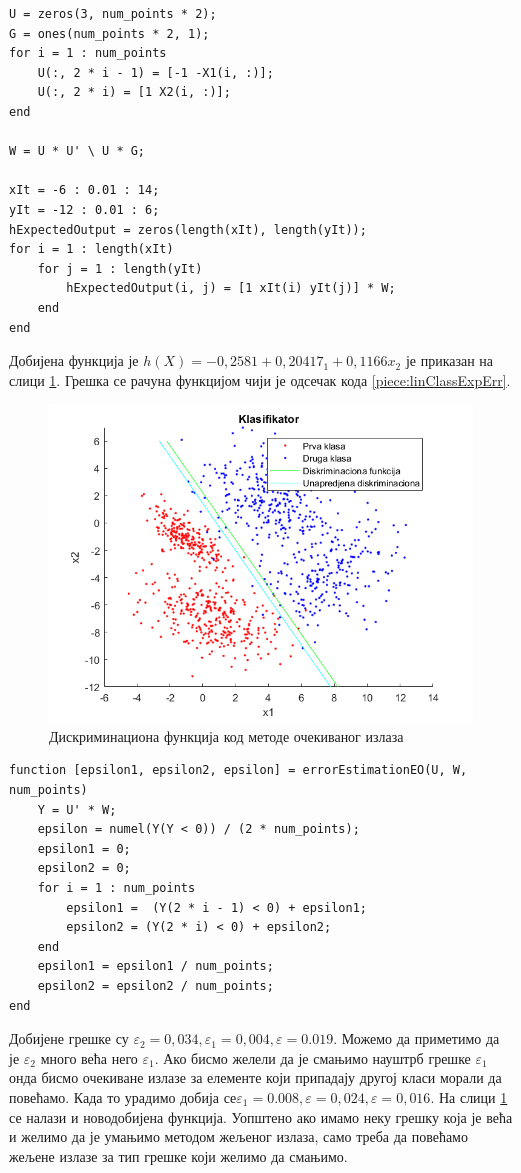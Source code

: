 \begin{lstlisting}[caption={Метода очекиваног излаза},label={piece:linClassExp}]
U = zeros(3, num_points * 2);
G = ones(num_points * 2, 1);
for i = 1 : num_points
    U(:, 2 * i - 1) = [-1 -X1(i, :)];
    U(:, 2 * i) = [1 X2(i, :)];
end

W = U * U' \ U * G;

xIt = -6 : 0.01 : 14;
yIt = -12 : 0.01 : 6;
hExpectedOutput = zeros(length(xIt), length(yIt));
for i = 1 : length(xIt)
    for j = 1 : length(yIt)
        hExpectedOutput(i, j) = [1 xIt(i) yIt(j)] * W;
    end
end
\end{lstlisting}

Добијена функција је $h(X) = -0,2581 + 0,20417_1 + 0,1166x_2$ је приказан на слици \ref{fig:expClassNorm}.
Грешка се рачуна функцијом чији је одсечак кода \ref{piece:linClassExpErr}. 
\begin{figure}[htb!]
\centering
\includegraphics[scale=1]{pictures/3/ExpClassNorm}
\caption{Дискриминациона функција код методе очекиваног излаза}\label{fig:expClassNorm}
\end{figure}

\begin{lstlisting}[caption={Метода очекиваног излаза - грешка},label={piece:linClassExpErr}]
function [epsilon1, epsilon2, epsilon] = errorEstimationEO(U, W, num_points)
    Y = U' * W;
    epsilon = numel(Y(Y < 0)) / (2 * num_points);
    epsilon1 = 0;
    epsilon2 = 0;
    for i = 1 : num_points
        epsilon1 =  (Y(2 * i - 1) < 0) + epsilon1;
        epsilon2 = (Y(2 * i) < 0) + epsilon2;
    end
    epsilon1 = epsilon1 / num_points;
    epsilon2 = epsilon2 / num_points;
end
\end{lstlisting}
Добијене грешке су $\varepsilon_2 = 0,034, \varepsilon_1=0,004, \varepsilon = 0.019$.
Можемо да приметимо да је $\varepsilon_2$ много већа него $\varepsilon_1$. Ако бисмо желели да је смањимо науштрб грешке $\varepsilon_1$ онда бисмо очекиване излазе за елементе који припадају другој класи морали да повећамо. Када то урадимо добија се$\varepsilon_1 = 0.008, \varepsilon=0,024, \varepsilon=0,016$. На слици \ref{fig:expClassNorm} се налази и новодобијена функција. Уопштено ако имамо неку грешку која је већа и желимо да је умањимо методом жељеног излаза, само треба да повећамо жељене излазе за тип грешке који желимо да смањимо.

